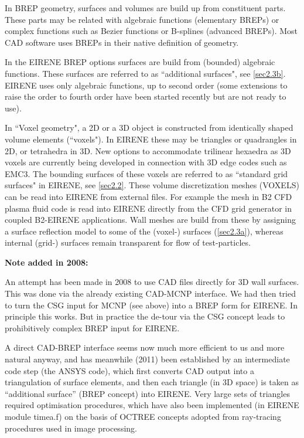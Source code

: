 \medskip

In \ac{BREP} geometry, surfaces and volumes are build up from constituent
parts.
These parts may be related with algebraic functions (elementary \acp{BREP}) or
complex functions such as Bezier functions or B-splines (advanced \acp{BREP}).
Most \ac{CAD} software uses \acp{BREP} in their native definition of geometry.

In the EIRENE \ac{BREP} options surfaces are build from (bounded) algebraic
functions.
These surfaces are referred to as ``additional surfaces", see \cref{sec2.3b}.
EIRENE uses only algebraic functions, up to second order (some	extensions to
raise the order to fourth order have been started recently but are not ready to
use).

\medskip

In ``Voxel geometry", a 2D or a 3D object is constructed from identically
shaped volume elements (``voxels").
In EIRENE these may be triangles or quadrangles in 2D, or tetrahedra in 3D.
New options to accommodate trilinear hexaedra as 3D voxels are currently being
developed in connection with 3D edge codes such as EMC3.
The bounding surfaces of these voxels are referred to as ``standard grid
surfaces" in EIRENE, see \cref{sec2.2}.
These volume discretization meshes (VOXELS) can be read into EIRENE from
external files.
For example the mesh in B2 \ac{CFD} plasma fluid code is read into EIRENE
directly from the \ac{CFD} grid generator in coupled B2-EIRENE applications.
Wall meshes are build from these by assigning a surface reflection model to
some of the (voxel-) surfaces (\cref{sec2.3a}), whereas internal (grid-)
surfaces remain transparent for flow of test-particles.

\textbf{Note added in 2008:} 

An attempt has been made in 2008 to use \ac{CAD} files directly for 3D wall
surfaces.
This was done via the already existing \acs{CAD}-\acs{MCNP} interface.
We had then tried to turn the \ac{CSG} input for \ac{MCNP} (see above) into a
\ac{BREP} form for EIRENE.
In principle this works.
But in practice the de-tour via the \ac{CSG} concept leads to prohibitively
complex \ac{BREP} input for EIRENE.

A direct \acs{CAD}-\acs{BREP} interface seems now much more efficient to us and
more natural anyway, and has meanwhile (2011) been established by an
intermediate code step (the ANSYS code), which first converts \ac{CAD} output
into a triangulation of surface elements, and then each triangle (in 3D space)
is taken as ``additional surface'' (\ac{BREP} concept) into EIRENE.
Very large sets of triangles required optimisation procedures, which have  also
been implemented (in EIRENE module timea.f) on the basis of OCTREE concepts
adopted from ray-tracing procedures used in image processing.

